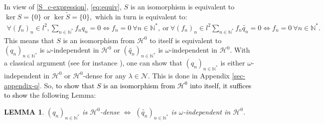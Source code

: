 \documentclass[11pt, dvipsnames]{amsart}
\newtheorem{lem}[theorem]{LEMMA}
\begin{document}
In view of \eqref{S_c-expression}, \eqref{eq:equiv}, $S$ is an isomorphism is equivalent to $\ker S=\{0\}$ or $\ker \tilde S=\{0\},$ which in turn is equivalent to: 
\begin{align*}
   \forall (f_{n})_{n}\in l^{2}, \sum_{n\in \mathbb{N}^*}f_n q_n=0 \Leftrightarrow f_n=0\ \forall n\in \mathbb{N}^*,\ \text{or}\ \forall (f_{n})_{n}\in l^{2} \sum_{n\in \mathbb{N}^*} f_n \widetilde{q_n}=0\Leftrightarrow  f_n=0\ \forall n\in \mathbb{N}^*.  
\end{align*}
This means that $S$ is an isomorphism from ${\mathcal{H}^0}$ to itself is equivalent to $(q_n)_{n\in\mathbb{N}^*}$ is $\omega$-independent in ${\mathcal{H}^0}$ or $(\widetilde{q_n})_{n\in\mathbb{N}^*}$ is $\omega$-independent in ${\mathcal{H}^0}$. With a classical argument (see for instance \cite{Coron2018-rapid,Gagnon2022-fredholm-laplacien,Gagnon2022-fredholm}), one can show that $(q_n)_{n\in\mathbb{N}^*}$ is either $\omega$-independent in ${\mathcal{H}^0}$ or ${\mathcal{H}^0}$-dense for any $\lambda\in \mathcal{N}$. This is done in Appendix \ref{sec-appendix-q}. So, \textcolor{black}{to show that $S$ is an isomorphism from $\mathcal{H}^{0}$ into itself, it suffices to show} the following Lemma:
\begin{lem}
    $(q_n)_{n\in\mathbb{N}^*}$ is ${\mathcal{H}^0}$-dense $\Leftrightarrow$ $(\widetilde{q_n})_{n\in\mathbb{N}^*}$ is $\omega$-independent in ${\mathcal{H}^0}$.
\end{lem}
\end{document}
